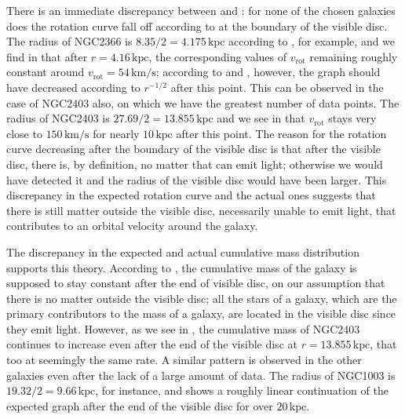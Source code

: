 \documentclass{article}
\newcommand\kpc{\textrm{kpc}}
\newcommand\kmps{\textrm{km}/\textrm{s}}
\newcommand\vrot{\ensuremath{v_{\textrm{rot}}}}
\begin{document}
There is an immediate discrepancy between  and : for none of the chosen galaxies does the rotation curve fall off according to  at the boundary of the visible disc.
The radius of NGC2366 is \(8.35/2 = 4.175\,\kpc\) according to , for example, and we find in  that after \(r = 4.16\,\kpc\), the corresponding values of \(\vrot\) remaining roughly constant around \(\vrot = 54\,\kmps\); according to  and , however, the graph should have decreased according to \(r^{-1/2}\) after this point.
This can be observed in the case of NGC2403 also, on which we have the greatest number of data points.
The radius of NGC2403 is \(27.69/2 = 13.855\,\kpc\) and we see in  that \(\vrot\) stays very close to \(150\,\kmps\) for nearly \(10\,\kpc\) after this point.
The reason for the rotation curve decreasing after the boundary of the visible disc is that after the visible disc, there is, by definition, no matter that can emit light; otherwise we would have detected it and the radius of the visible disc would have been larger.
This discrepancy in the expected rotation curve and the actual ones suggests that there is still matter outside the visible disc, necessarily unable to emit light, that contributes to an orbital velocity around the galaxy.

The discrepancy in the expected and actual cumulative mass distribution supports this theory.
According to , the cumulative mass of the galaxy is supposed to stay constant after the end of visible disc, on our assumption that there is no matter outside the visible disc; all the stars of a galaxy, which are the primary contributors to the mass of a galaxy, are located in the visible disc since they emit light.
However, as we see in , the cumulative mass of NGC2403 continues to increase even after the end of the visible disc at \(r = 13.855\,\kpc\), that too at seemingly the same rate.
A similar pattern is observed in the other galaxies even after the lack of a large amount of data.
The radius of NGC1003 is \(19.32/2 = 9.66\,\kpc\), for instance, and  shows a roughly linear continuation of the expected graph after the end of the visible disc for over \(20\,\kpc\).
\end{document}
